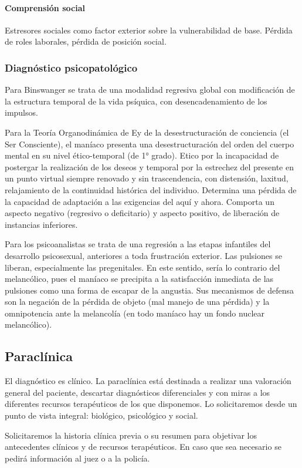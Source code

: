 \paragraph{Comprensión social}
Estresores sociales como factor exterior sobre la vulnerabilidad de base. Pérdida de roles laborales, pérdida de posición social.
\subsubsection*{Diagnóstico psicopatológico}
Para Binswanger se trata de una modalidad regresiva global con modificación de la estructura temporal de la vida psíquica, con desencadenamiento de los impulsos.

Para la Teoría Organodinámica de Ey de la desestructuración de conciencia (el Ser Consciente), el maníaco presenta una desestructuración del orden del cuerpo mental en su nivel ético-temporal (de 1° grado). Etico por la incapacidad de postergar la realización de los deseos y temporal por la estrechez del presente en un punto virtual siempre renovado y sin trascendencia, con distensión, laxitud, relajamiento de la continuidad histórica del individuo. Determina una pérdida de la capacidad de adaptación a las exigencias del aquí y ahora. Comporta un aspecto negativo (regresivo o deficitario) y aspecto positivo, de liberación de instancias inferiores.

Para los psicoanalistas se trata de una regresión a las etapas infantiles del desarrollo psicosexual, anteriores a toda frustración exterior. Las pulsiones se liberan, especialmente las pregenitales. En este sentido, sería lo contrario del melancólico, pues el maníaco se precipita a la satisfacción inmediata de las pulsiones como una forma de escapar de la angustia. Sus mecanismos de defensa son la negación de la pérdida de objeto (mal manejo de una pérdida) y la omnipotencia ante la melancolía (en todo maníaco hay un fondo nuclear melancólico).
\subsection*{Paraclínica}
El diagnóstico es clínico. La paraclínica está destinada a realizar una valoración general del paciente, descartar diagnósticos diferenciales y con miras a los diferentes recursos terapéuticos de los que disponemos. Lo solicitaremos desde un punto de vista integral: biológico, psicológico y social.

Solicitaremos la historia clínica previa o su resumen para objetivar los antecedentes clínicos y de recursos terapéuticos. En caso que sea necesario se pedirá información al juez o a la policía.
